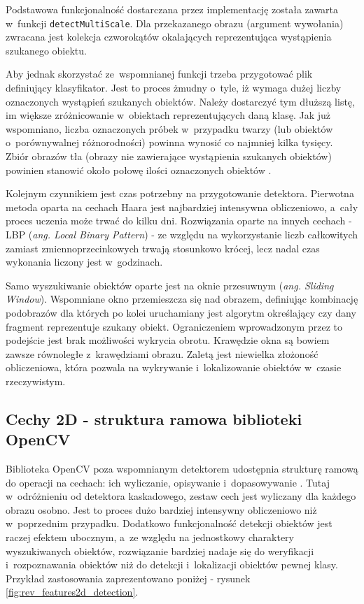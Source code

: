 Podstawowa funkcjonalność dostarczana przez implementację została zawarta
w~funkcji \verb|detectMultiScale|\cite{OCV:cascadeclassification}.
Dla przekazanego obrazu (argument wywołania)
zwracana jest kolekcja czworokątów okalających
reprezentująca wystąpienia szukanego obiektu.

Aby jednak skorzystać
ze~wspomnianej funkcji trzeba przygotować plik
definiujący klasyfikator. Jest to proces żmudny o~tyle, iż wymaga
dużej liczby oznaczonych wystąpień szukanych obiektów. Należy dostarczyć
tym dłuższą listę, im większe zróżnicowanie w~obiektach reprezentujących
daną klasę. Jak już wspomniano, liczba oznaczonych próbek
w~przypadku twarzy (lub obiektów o~porównywalnej
różnorodności) powinna wynosić
co najmniej kilka tysięcy. Zbiór obrazów tła (obrazy nie zawierające 
wystąpienia szukanych obiektów)
powinien stanowić około połowę ilości oznaczonych obiektów
\cite{WEB:ocvnaotoshiseodocument}.

Kolejnym czynnikiem jest czas potrzebny na przygotowanie detektora.
Pierwotna metoda oparta na cechach Haara
jest najbardziej intensywna obliczeniowo, a~cały proces uczenia
może trwać do kilku dni. Rozwiązania oparte na innych cechach - LBP
(\textit{ang. Local Binary Pattern}) - ze względu na wykorzystanie
liczb całkowitych zamiast zmiennoprzecinkowych trwają stosunkowo krócej, 
lecz nadal czas wykonania liczony jest w~godzinach.

Samo wyszukiwanie obiektów oparte jest na oknie przesuwnym
(\textit{ang. Sliding Window}). Wspomniane okno przemieszcza się nad
obrazem, definiując kombinację podobrazów dla których po kolei uruchamiany
jest algorytm określający czy dany fragment reprezentuje szukany obiekt.
Ograniczeniem wprowadzonym przez to podejście jest brak możliwości
wykrycia obrotu. Krawędzie okna są bowiem zawsze równoległe z~krawędziami
obrazu. Zaletą jest niewielka złożoność obliczeniowa, która pozwala
na wykrywanie i~lokalizowanie obiektów w~czasie rzeczywistym.

\subsection{Cechy 2D - struktura ramowa biblioteki OpenCV}

Biblioteka OpenCV poza wspomnianym detektorem udostępnia
strukturę ramową do operacji na cechach: ich wyliczanie, opisywanie
i~dopasowywanie \cite{OCV:feture2dframework}.
Tutaj w~odróżnieniu od detektora kaskadowego, zestaw cech
jest wyliczany dla każdego obrazu osobno. Jest to proces dużo bardziej
intensywny obliczeniowo niż w~poprzednim przypadku. Dodatkowo
funkcjonalność detekcji obiektów jest raczej efektem ubocznym,
a~ze względu na jednostkowy charaktery wyszukiwanych obiektów, rozwiązanie
bardziej nadaje się do weryfikacji i~rozpoznawania obiektów niż do
detekcji i~lokalizacji obiektów pewnej klasy. Przykład zastosowania
zaprezentowano poniżej - rysunek \ref{fig:rev_features2d_detection}.

